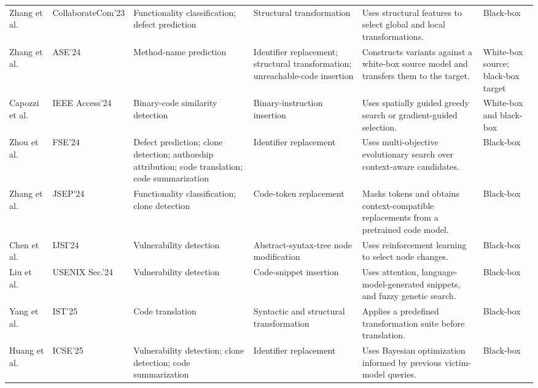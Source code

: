 \documentclass[acmsmall,screen,review]{acmart}
\begin{document}
{\begin{longtable}{@{}L{2.1cm}L{1.5cm}L{2.30cm}L{2.50cm}L{3.50cm}L{1.35cm}@{}}
Zhang et al.~\cite{zhang2023struck} &
Collaborate\allowbreak{}Com\allowbreak'23 &
Functionality classification; defect prediction &
Structural transformation &
Uses structural features to select global and local transformations. &
Black-box \\

Zhang et al.~\cite{transfer2024coding} &
ASE'24 &
Method-name prediction &
Identifier replacement; structural transformation; unreachable-code insertion &
Constructs variants against a white-box source model and transfers them to the target. &
White-box source; black-box target \\

Capozzi et al.~\cite{spatialgreedy2024} &
IEEE Access'24 &
Binary-code similarity detection &
Binary-instruction insertion &
Uses spatially guided greedy search or gradient-guided selection. &
White-box and black-box \\

Zhou et al.~\cite{moaa2024} &
FSE'24 &
Defect prediction; clone detection; authorship attribution; code translation; code summarization &
Identifier replacement &
Uses multi-objective evolutionary search over context-aware candidates. &
Black-box \\

Zhang et al.~\cite{codebertattack2024} &
JSEP'24 &
Functionality classification; clone detection &
Code-token replacement &
Masks tokens and obtains context-compatible replacements from a pretrained code model. &
Black-box \\

Chen et al.~\cite{rlattack2024} &
IJSI'24 &
Vulnerability detection &
Abstract-syntax-tree node modification &
Uses reinforcement learning to select node changes. &
Black-box \\

Liu et al.~\cite{liu2024eatvul} &
USENIX Sec.'24 &
Vulnerability detection &
Code-snippet insertion &
Uses attention, language-model-generated snippets, and fuzzy genetic search. &
Black-box \\

Yang et al.~\cite{yang2025cotr} &
IST'25 &
Code translation &
Syntactic and structural transformation &
Applies a predefined transformation suite before translation. &
Black-box \\

Huang et al.~\cite{huang2025iterative} &
ICSE'25 &
Vulnerability detection; clone detection; code summarization &
Identifier replacement &
Uses Bayesian optimization informed by previous victim-model queries. &
Black-box \\


\end{longtable}}
\end{document}
